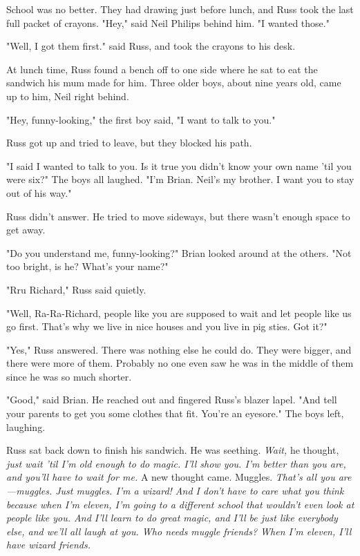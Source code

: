 School was no better. They had drawing just before lunch, and Russ took the last full packet of crayons. "Hey," said Neil Philips behind him. "I wanted those."

"Well, I{\el} got them{\el} first." said Russ, and took the crayons to his desk.

At lunch time, Russ found a bench off to one side where he sat to eat the sandwich his mum made for him. Three older boys, about nine years old, came up to him, Neil right behind.

"Hey, funny-looking," the first boy said, "I want to talk to you."

Russ got up and tried to leave, but they blocked his path.

"I said I wanted to talk to you. Is it true you didn't know your own name 'til you were six?" The boys all laughed. "I'm Brian. Neil's my brother. I want you to stay out of his way."

Russ didn't answer. He tried to move sideways, but there wasn't enough space to get away.

"Do you understand me, funny-looking?" Brian looked around at the others. "Not too bright, is he? What's your name?"

"R{\el}ru{\el} Richard," Russ said quietly.

"Well, Ra-Ra-Richard, people like you are supposed to wait and let people like us go first. That's why we live in nice houses and you live in pig sties. Got it?"

"Y{\el}es," Russ answered. There was nothing else he could do. They were bigger, and there were more of them. Probably no one even saw he was in the middle of them since he was so much shorter.

"Good," said Brian. He reached out and fingered Russ's blazer lapel. "And tell your parents to get you some clothes that fit. You're an eyesore." The boys left, laughing.

Russ sat back down to finish his sandwich. He was seething. \emph{Wait,} he thought, \emph{just wait 'til I'm old enough to do magic. I'll show you. I'm better than you are, and you'll have to wait for me.} A new thought came. Muggles. \emph{That's all you are—muggles. Just muggles. I'm a wizard! And I don't have to care what you think because when I'm eleven, I'm going to a different school that wouldn't even look at people like you. And I'll learn to do great magic, and I'll be just like everybody else, and we'll all laugh at you. Who needs muggle friends? When I'm eleven, I'll have wizard friends.}

